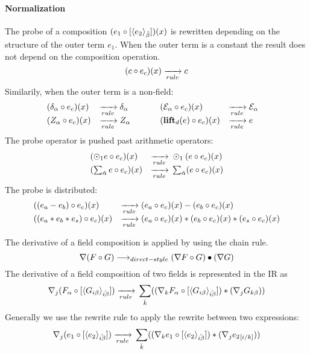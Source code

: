 \documentclass{article}
\begin{document}
\paragraph{Normalization}
The probe of a composition
 $(\expComp{e_1}{e_2}{\beta})(x)$ 
 is rewritten depending on the structure of the outer term $e_1$. 
When the outer term is a constant the result does not depend on the composition operation.
$$(\expCompSingle{ c}{e_2}{\beta})(x) \rewriteRule{} c $$
Similarily, when the outer term is a non-field:
$$\begin{array}{lllllll}
(\expCompSingle{ \delta_{\alpha}}{e_2}{\beta})(x) &\rewriteRule{} \delta_{\alpha}& \indent &
(\expCompSingle{ \mathcal{E}_{\alpha}}{e_2}{\beta})(x) &\rewriteRule{} \mathcal{E}_{\alpha}\\
(\expCompSingle{ Z_{\alpha}}{e_2}{\beta})(x) &\rewriteRule{} Z_{\alpha} &&
(\expCompSingle{ \lift{e}}{e_2}{\beta})(x) &\rewriteRule{} e &
\end{array}$$
The probe operator is pushed past arithmetic operators:
$$\begin{array}{lllll}
(\expCompSingle{\odot_1 e}{e_2}{\beta})(x) &\rewriteRule{} \odot_1 (  \expCompSingle{e}{e_2}{\beta})(x) \\
(\expCompSingle{\sum_{\hat{\alpha}} e}{e_2}{\beta})(x) &\rewriteRule{} \sum_{\hat{\alpha}} (  \expCompSingle{e}{e_2}{\beta})(x) \\
\end{array}$$
The probe is distributed: 
$$\begin{array}{lllll}
(\expCompSingle{(e_a - e_b)}{e_2}{\beta})(x) &\rewriteRule{} (\expCompSingle{e_a}{e_2}{\beta})(x) -(\expCompSingle{e_b}{e_2}{\beta})(x) \\
(\expCompSingle{(e_a * e_b * e_s )}{e_2}{\beta})(x) &\rewriteRule{} (\expCompSingle{e_a}{e_2}{\beta})(x) * (\expCompSingle{e_b}{e_2}{\beta})(x)*(\expCompSingle{e_s}{e_2}{\beta})(x) \end{array}$$



The derivative of a field composition is applied by using the chain rule.\\
$$\nabla (F \circ G) \rowSurface (\nabla F \circ G)\bullet (\nabla G) $$
The derivative of a field composition of two fields is represented in the \name{} IR as 
$$\nabla_j (\expComp{F_\alpha}{G_{i\beta}}{i\beta}) \rewriteRule{}
\sum_{\hat{k}}( (\expComp{\nabla_k  F_\alpha}{G_{i\beta}}{i\beta}) * (\nabla_j G_{k\beta}) )$$
Generally we use the rewrite rule to apply the rewrite between two \name{} expressions:\\
$$\nabla_j (\expComp{e_1}{e_2}{i\beta}) \rewriteRule{}
\sum_{\hat{k}}( (\expComp{\nabla_k  e_1}{e_2}{i\beta}) * (\nabla_j \expIndex{e_2}{i}{k}) )$$
\end{document}
